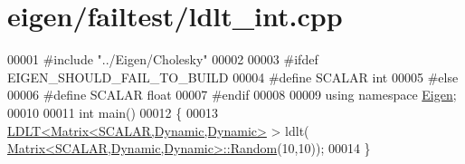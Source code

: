 \hypertarget{eigen_2failtest_2ldlt__int_8cpp_source}{}\section{eigen/failtest/ldlt\+\_\+int.cpp}
\label{eigen_2failtest_2ldlt__int_8cpp_source}

\begin{DoxyCode}
00001 \textcolor{preprocessor}{#include "../Eigen/Cholesky"}
00002 
00003 \textcolor{preprocessor}{#ifdef EIGEN\_SHOULD\_FAIL\_TO\_BUILD}
00004 \textcolor{preprocessor}{#define SCALAR int}
00005 \textcolor{preprocessor}{#else}
00006 \textcolor{preprocessor}{#define SCALAR float}
00007 \textcolor{preprocessor}{#endif}
00008 
00009 \textcolor{keyword}{using namespace }\hyperlink{namespace_eigen}{Eigen};
00010 
00011 \textcolor{keywordtype}{int} main()
00012 \{
00013   \hyperlink{group___cholesky___module_class_eigen_1_1_l_d_l_t}{LDLT<Matrix<SCALAR,Dynamic,Dynamic>} > ldlt(
      \hyperlink{group___core___module_class_eigen_1_1_matrix}{Matrix<SCALAR,Dynamic,Dynamic>::Random}(10,10));
00014 \}
\end{DoxyCode}

